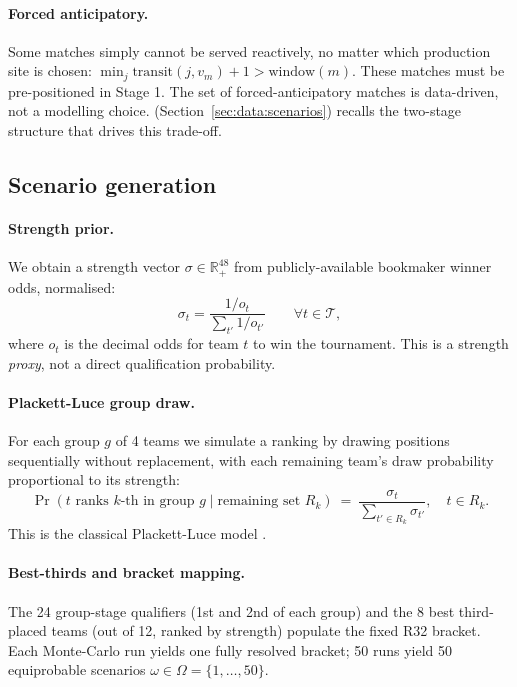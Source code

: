 \documentclass[11pt,a4paper]{article}
\numberwithin{equation}{section}
\begin{document}
\paragraph{Forced anticipatory.} Some matches simply cannot be served reactively, no matter which production site is chosen: $\min_j \mathrm{transit}(j, v_m) + 1 > \mathrm{window}(m)$. These matches must be pre-positioned in Stage 1. The set of forced-anticipatory matches is data-driven, not a modelling choice.  (Section~\ref{sec:data:scenarios}) recalls the two-stage structure that drives this trade-off.

\subsection{Scenario generation}\label{sec:partII:scenarios}

\paragraph{Strength prior.} We obtain a strength vector $\sigma \in \mathbb{R}_+^{48}$ from publicly-available bookmaker winner odds, normalised:
\begin{equation}
\sigma_t = \frac{1/o_t}{\sum_{t'} 1/o_{t'}} \qquad \forall t \in \mathcal{T}, \label{eq:strength}
\end{equation}
where $o_t$ is the decimal odds for team $t$ to win the tournament. This is a strength \emph{proxy}, not a direct qualification probability.

\paragraph{Plackett-Luce group draw.} For each group $g$ of 4 teams we simulate a ranking by drawing positions sequentially without replacement, with each remaining team's draw probability proportional to its strength:
\begin{equation}
\Pr(t \text{ ranks $k$-th in group $g$} \mid \text{remaining set } R_k) \ =\ \frac{\sigma_t}{\sum_{t' \in R_k} \sigma_{t'}}, \quad t \in R_k. \label{eq:placketluce}
\end{equation}
This is the classical Plackett-Luce model \cite{plackett1975}.

\paragraph{Best-thirds and bracket mapping.} The 24 group-stage qualifiers (1st and 2nd of each group) and the 8 best third-placed teams (out of 12, ranked by strength) populate the fixed R32 bracket. Each Monte-Carlo run yields one fully resolved bracket; 50 runs yield 50 equiprobable scenarios $\omega \in \Omega = \{1, \ldots, 50\}$.
\end{document}
